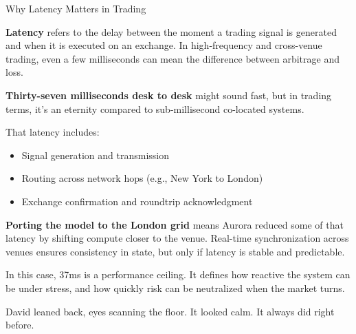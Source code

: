 \medskip

\begin{TechnicalSidebar}{Why Latency Matters in Trading}

  \textbf{Latency} refers to the delay between the moment a trading signal is generated and when it 
  is executed on an exchange.  
  In high-frequency and cross-venue trading, even a few milliseconds can mean the difference 
  between arbitrage and loss.

  \medskip

  \textbf{Thirty-seven milliseconds desk to desk} might sound fast, but in trading terms, it’s an eternity 
  compared to sub-millisecond co-located systems.  

  \medskip

  That latency includes:

  \begin{itemize}
    \item Signal generation and transmission
    \item Routing across network hops (e.g., New York to London)
    \item Exchange confirmation and roundtrip acknowledgment
  \end{itemize}

  \medskip

  \textbf{Porting the model to the London grid} means Aurora reduced some of that latency by 
  shifting compute closer to the venue.  
  Real-time synchronization across venues ensures consistency in state, but only if latency 
  is stable and predictable.

  \medskip

  In this case, 37ms is a performance ceiling.  
  It defines how reactive the system can be under stress, and how quickly risk can be 
  neutralized when the market turns.

\end{TechnicalSidebar}

\medskip

David leaned back, eyes scanning the floor. It looked calm.
It always did right before.




